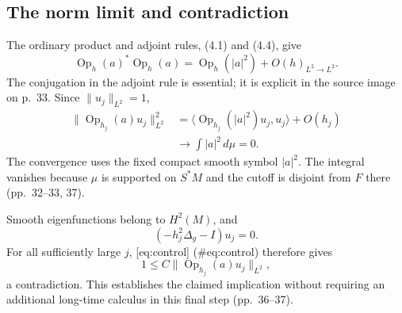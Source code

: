 \documentclass[10pt]{article}
\begin{document}
\subsection*{The norm limit and contradiction}
The ordinary product and adjoint rules, (4.1) and (4.4), give \[\operatorname{Op}_h(a)^*\operatorname{Op}_h(a)=\operatorname{Op}_h(|a|^2)+O(h)_{L^2\to L^2}.\] The conjugation in the adjoint rule is essential; it is explicit in the source image on p. 33. Since \(\|u_j\|_{L^2}=1\), \[\begin{aligned}
 \|\operatorname{Op}_{h_j}(a)u_j\|_{L^2}^2
 &=\langle\operatorname{Op}_{h_j}(|a|^2)u_j,u_j\rangle+O(h_j)\\
 &\longrightarrow\int |a|^2\,d\mu=0.\end{aligned}\] The convergence uses the fixed compact smooth symbol \(|a|^2\). The integral vanishes because \(\mu\) is supported on \(S^*M\) and the cutoff is disjoint from \(F\) there (pp. 32–33, 37).\par
Smooth eigenfunctions belong to \(H^2(M)\), and \[(-h_j^2\Delta_g-I)u_j=0.\] For all sufficiently large \(j\), [eq:control] (\#eq:control) therefore gives \[1\le C\|\operatorname{Op}_{h_j}(a)u_j\|_{L^2},\] a contradiction. This establishes the claimed implication without requiring an additional long-time calculus in this final step (pp. 36–37).\par
\end{document}
